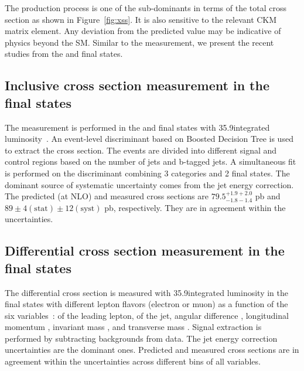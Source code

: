  The \tW production process is one of the sub-dominants in terms of the total cross section as 
 shown in Figure~\ref{fig:xss}. It is also sensitive to the relevant CKM matrix element. 
 Any deviation from the predicted value may be indicative of physics beyond the SM. Similar to the 
 \ttbar measurement, we present the recent studies from the \ljets and \dilep final states.

 \subsection{Inclusive cross section measurement in the \texorpdfstring{\ljets}{ljets} final states}
 The measurement is performed in the \ejets and \mujets final states with 35.9\fbinv integrated
 luminosity~\cite{CMS-PAS-TOP-20-002}. An event-level discriminant based on Boosted Decision Tree 
 is used to extract the cross section. The events are divided into different signal and control 
 regions based on the number of jets and b-tagged jets. A simultaneous fit is performed on the
 discriminant combining 3 categories and 2 final states. The dominant source of systematic 
 uncertainty comes from the jet energy correction. The predicted (at NLO) and 
 measured cross sections are $79.5^{+1.9+2.0}_{-1.8-1.4}$ pb and 
 $89 \pm 4 (\text{stat}) \pm 12 (\text{syst})$ pb, respectively. They are in agreement within the
 uncertainties.

 \subsection{Differential cross section measurement in the \texorpdfstring{\dilep}{dilep} final states}
 The differential cross section is measured with 35.9\fbinv integrated luminosity in the \dilep final
 states with different lepton flavors (electron or muon) as a function of the six 
 variables~\cite{CMS-PAS-TOP-19-003}: \pt of the leading lepton, \pt of the jet, angular difference
 \deltaPhiVar, longitudinal momentum \pzvar, invariant mass \invmassvar, and transverse mass 
 \transmassvar. Signal extraction is performed by subtracting backgrounds from data. The jet energy 
 correction uncertainties are the dominant ones. Predicted and measured cross sections are in 
 agreement within the uncertainties across different bins of all variables.

